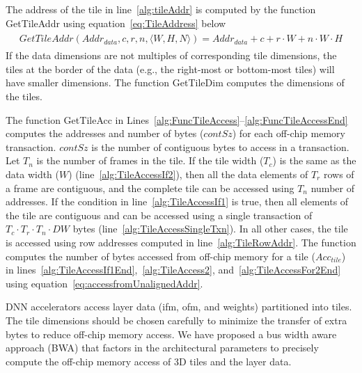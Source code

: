 The address of the tile in line~\ref{alg:tileAddr} is computed by the function GetTileAddr using equation~\ref{eq:TileAddress} below
\begin{align}\label{eq:TileAddress}
	\begin{split}
		GetTileAddr(Addr_{data},c,r,n,\langle W,H,N\rangle){=}Addr_{data} + c + r\cdot W + n\cdot W\cdot H
	\end{split}
\end{align}
If the data dimensions are not multiples of corresponding tile dimensions, the tiles at the border of the data (e.g., the right-most or bottom-most tiles) will have smaller dimensions. The function GetTileDim computes the dimensions of the tiles.

The function GetTileAcc in Lines~\ref{alg:FuncTileAccess}--\ref{alg:FuncTileAccessEnd} computes the addresses and number of bytes ($contSz$) for each off-chip memory transaction. $contSz$ is the number of contiguous bytes to access in a transaction. Let $T_n$ is the number of frames in the tile. If the tile width ($T_c$) is the same as the data width ($W$) (line~\ref{alg:TileAccessIf2}), then all the data elements of $T_r$ rows of a frame are contiguous, and the complete tile can be accessed using $T_n$ number of addresses. If the condition in line~\ref{alg:TileAccessIf1} is true, then all elements of the tile are contiguous and can be accessed using a single transaction of $T_c\cdot T_r\cdot T_n\cdot DW$ bytes (line~\ref{alg:TileAccessSingleTxn}). In all other cases, the tile is accessed using row addresses computed in line~\ref{alg:TileRowAddr}. The function computes the number of bytes accessed from off-chip memory for a tile ($Acc_{tile}$) in lines~\ref{alg:TileAccessIf1End},~\ref{alg:TileAccess2}, and~\ref{alg:TileAccessFor2End} using equation~\ref{eq:accessfromUnalignedAddr}. 

DNN accelerators access layer data (ifm, ofm, and weights) partitioned into tiles. The tile dimensions should be chosen carefully to minimize the transfer of extra bytes to reduce off-chip memory access. We have proposed a bus width aware approach (BWA) that factors in the architectural parameters to precisely compute the off-chip memory access of 3D tiles and the layer data.

